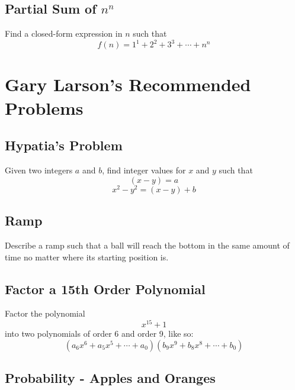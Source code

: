 \documentclass[letterpaper, 11pt]{report}
\numberwithin{equation}{section}
\begin{document}
			
		\section{Partial Sum of $ n^n $}
			
			
			Find a closed-form expression in $ n $ such that
			\begin{equation}
				f(n) = 1^1 + 2^2 + 3^3 + \cdots + n^n
			\end{equation}
			
			
	
	
	\chapter{Gary Larson's Recommended Problems}
		
		
		
		\section{Hypatia's Problem}
			
			
			Given two integers \(a\) and \(b\), find integer values for \(x\) and \(y\) such that
			\begin{equation}
				(x-y) = a
			\end{equation}
			\begin{equation}
				x^2 - y^2 = (x-y) + b
			\end{equation}
			
			
		\section{Ramp}
			
			
			Describe a ramp such that a ball will reach the bottom in the same amount of time no matter where its starting position is.
			
			
		\section{Factor a 15th Order Polynomial}
			
			
			Factor the polynomial
			\begin{equation}
				x^{15} + 1
			\end{equation}
			into two polynomials of order 6 and order 9, like so:
			\begin{equation}
				(a_6x^6 + a_5x^5 + \cdots + a_0)(b_9x^9 + b_8x^8 + \cdots + b_0)
			\end{equation}
			
			
		\section{Probability - Apples and Oranges}
			
\end{document}
